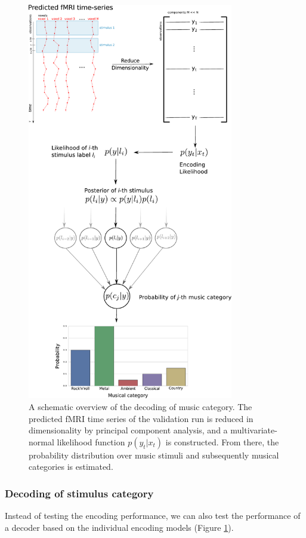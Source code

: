 \begin{figure}
  \centering
  \includegraphics[width=9cm]{pics/Decoding_scheme}

  \caption{A schematic overview of the decoding of music category. The
    predicted f{MRI} time series of the validation run is reduced in
    dimensionality by principal component analysis, and a multivariate-normal
    likelihood function $p(y_{t}|x_{t})$ is constructed.  From there, the
  probability distribution over music stimuli and subsequently musical
categories is estimated.}

 \label{fig:decoding_scheme}
\end{figure}


\subsubsection*{Decoding of stimulus category}

Instead of testing the encoding performance, we can also test the performance
of a decoder based on the individual encoding models \citep{NG11} (Figure
\ref{fig:decoding_scheme}).


